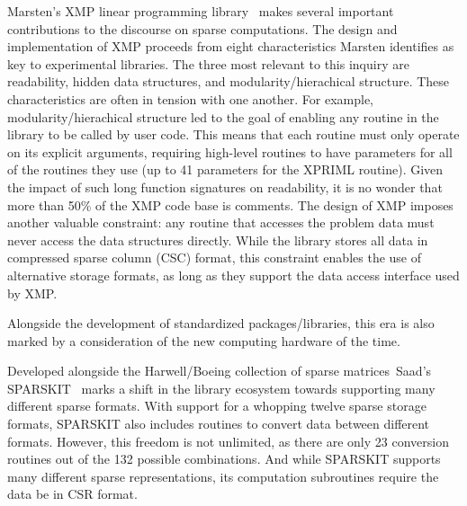 Marsten's XMP linear programming library~\cite{marsten1981design} makes several important contributions to the discourse on sparse computations.
The design and implementation of XMP proceeds from eight characteristics Marsten identifies as key to experimental libraries. 
The three most relevant to this inquiry are readability, hidden data structures, and modularity/hierachical structure. 
These characteristics are often in tension with one another. 
For example, modularity/hierachical structure led to the goal of enabling any routine in the library to be called by user code.
This means that each routine must only operate on its explicit arguments, requiring high-level routines to have parameters for all of the routines they use (up to 41 parameters for the XPRIML routine).
Given the impact of such long function signatures on readability, it is no wonder that more than 50\% of the XMP code base is comments.
The design of XMP imposes another valuable constraint: any routine that accesses the problem data must never access the data structures directly. 
While the library stores all data in compressed sparse column (CSC) format, this constraint enables the use of alternative storage formats, as long as they support the data access interface used by XMP.

Alongside the development of standardized packages/libraries, this era is also marked by a consideration of the new computing hardware of the time.

\cite{duff1982experience}
\cite{cleveland1987progress}


\cite{dongarraxz1994sparse}
Developed alongside the Harwell/Boeing collection of sparse matrices~\cite{duff1989sparse}Saad's SPARSKIT~\cite{saad1990sparskit} marks a shift in the library ecosystem towards supporting many different sparse formats. 
With support for a whopping twelve sparse storage formats, SPARSKIT also includes routines to convert data between different formats. 
However, this freedom is not unlimited, as there are only 23 conversion routines out of the 132 possible combinations. 
And while SPARSKIT supports many different sparse representations, its computation subroutines require the data be in CSR format. 




\cite{pothen1990computing}
\cite{montagne2004optimal}
\cite{shahnaz2005review}

